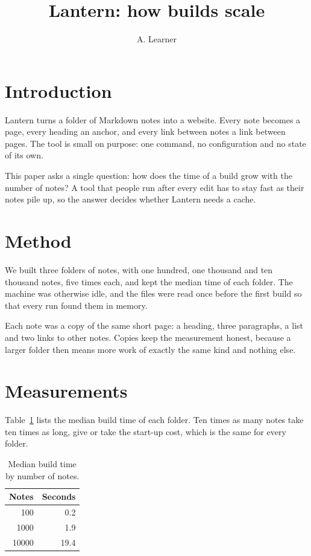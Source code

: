\documentclass[12pt]{article}
\title{Lantern: how builds scale}
\author{A. Learner}
\date{}
\begin{document}
\maketitle

\section{Introduction}
\label{sec:introduction}

Lantern turns a folder of Markdown notes into a website. Every note
becomes a page, every heading an anchor, and every link between notes
a link between pages. The tool is small on purpose: one command, no
configuration and no state of its own.

This paper asks a single question: how does the time of a build grow
with the number of notes? A tool that people run after every edit has
to stay fast as their notes pile up, so the answer decides whether
Lantern needs a cache.

\section{Method}
\label{sec:method}

We built three folders of notes, with one hundred, one thousand and
ten thousand notes, five times each, and kept the median time of each
folder. The machine was otherwise idle, and the files were read once
before the first build so that every run found them in memory.

Each note was a copy of the same short page: a heading, three
paragraphs, a list and two links to other notes. Copies keep the
measurement honest, because a larger folder then means more work of
exactly the same kind and nothing else.

\section{Measurements}
\label{sec:measurements}

Table~\ref{tab:times} lists the median build time of each folder. Ten
times as many notes take ten times as long, give or take the start-up
cost, which is the same for every folder.

\begin{table}[h]
  \centering
  \begin{tabular}{rr}
    \hline
    Notes & Seconds \\
    \hline
    100 & 0.2 \\
    1000 & 1.9 \\
    10000 & 19.4 \\
    \hline
  \end{tabular}
  \caption{Median build time by number of notes.}
  \label{tab:times}
\end{table}
\end{document}
